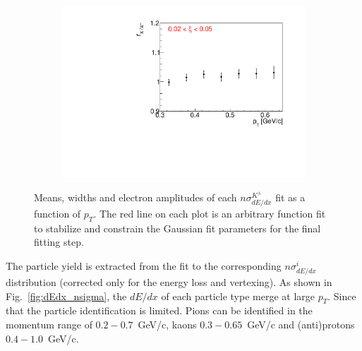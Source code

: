 \begin{figure}[h!]
\begin{subfigure}{.32\textwidth}
	\end{subfigure}
	\begin{subfigure}{.32\textwidth}
		\includegraphics[width=\linewidth, page=12]{chapters/chrgSTAR/img/dEdx/fit2019_fitResult_1_0_step_0.pdf}
	\end{subfigure}
	\caption[Means, widths and electron amplitudes of each $n\sigma^{K^\pm}_{dE/dx}$ fit as a function of $p_T$.]{Means, widths and electron amplitudes of each $n\sigma^{K^\pm}_{dE/dx}$ fit as a function of $p_T$.  The red line on each plot is an arbitrary function fit to stabilize and constrain the Gaussian fit parameters for the final fitting step.}
	\label{fig:dEdx_fit_parametersK}
\end{figure}

The particle yield is extracted from the fit to the corresponding
$n\sigma^{i}_{dE/dx}$  distribution (corrected only for the energy loss and vertexing). As shown in Fig.~\ref{fig:dEdx_nsigma}, the $dE/dx$ of each particle type merge at large $p_T$. Since that  the particle identification is limited. Pions can be identified
in the momentum range of $0.2-0.7$~GeV/c, kaons
$0.3-0.65$~GeV/c and (anti)protons $0.4-1.0$~GeV/c. 
\FloatBarrier
